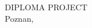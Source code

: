 \documentclass[
    12pt,
    english, %
    singlespacing, %
    oneside, %
]{MastersDoctoralThesis} %
\begin{document}
\begin{titlepage}
\begin{center}
            \vfill
            \textsc{\Large DIPLOMA PROJECT}\\[0.5cm]



            \vspace*{\fill}
            {\large Poznan, \the\year{}}

        \end{center}
    \end{titlepage}


%
%
%
\end{document}
